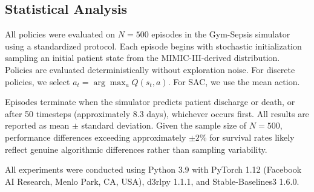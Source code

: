 \subsection{Statistical Analysis}\label{sec:methods:stats}

All policies were evaluated on $N = 500$ episodes in the Gym-Sepsis simulator using a standardized protocol. Each episode begins with stochastic initialization sampling an initial patient state from the MIMIC-III-derived distribution. Policies are evaluated deterministically without exploration noise. For discrete policies, we select $a_t = \arg\max_a Q(s_t, a)$. For SAC, we use the mean action.

Episodes terminate when the simulator predicts patient discharge or death, or after 50 timesteps (approximately 8.3 days), whichever occurs first. All results are reported as mean $\pm$ standard deviation. Given the sample size of $N = 500$, performance differences exceeding approximately $\pm 2\%$ for survival rates likely reflect genuine algorithmic differences rather than sampling variability.

All experiments were conducted using Python 3.9 with PyTorch 1.12 (Facebook AI Research, Menlo Park, CA, USA), d3rlpy 1.1.1, and Stable-Baselines3 1.6.0.

